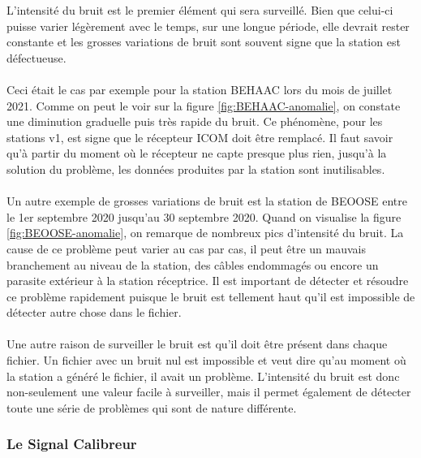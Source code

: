 \documentclass[11pt]{article}
\begin{document}
L'intensité du bruit est le premier élément qui sera surveillé.
Bien que celui-ci puisse varier légèrement avec le temps, sur une longue période, elle devrait rester constante et les grosses variations de bruit sont souvent signe que la station est défectueuse.\\
\\
Ceci était le cas par exemple pour la station BEHAAC lors du mois de juillet 2021.
Comme on peut le voir sur la figure \ref{fig:BEHAAC-anomalie}, on constate une diminution graduelle puis très rapide du bruit.
Ce phénomène, pour les stations v1, est signe que le récepteur ICOM doit être remplacé.
Il faut savoir qu'à partir du moment où le récepteur ne capte presque plus rien, jusqu'à la solution du problème, les données produites par la station sont inutilisables.\\
\\
Un autre exemple de grosses variations de bruit est la station de BEOOSE entre le 1er septembre 2020 jusqu'au 30 septembre 2020.
Quand on visualise la figure \ref{fig:BEOOSE-anomalie}, on remarque de nombreux pics d'intensité du bruit.
La cause de ce problème peut varier au cas par cas, il peut être un mauvais branchement au niveau de la station, des câbles endommagés ou encore un parasite extérieur à la station réceptrice.
Il est important de détecter et résoudre ce problème rapidement puisque le bruit est tellement haut qu'il est impossible de détecter autre chose dans le fichier.\\
\\
Une autre raison de surveiller le bruit est qu'il doit être présent dans chaque fichier.
Un fichier avec un bruit nul est impossible et veut dire qu'au moment où la station a généré le fichier, il avait un problème.
L'intensité du bruit est donc non-seulement une valeur facile à surveiller, mais il permet également de détecter toute une série de problèmes qui sont de nature différente.

\subsubsection{Le Signal Calibreur}
\end{document}
